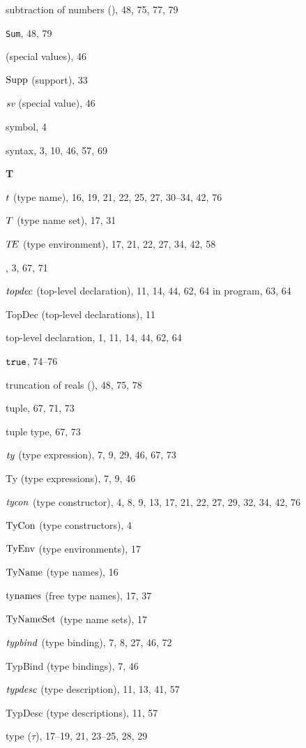 \begin{theindex}
\item subtraction of numbers (\ml{-}), 48, 75, 77, 79
\item {\tt Sum}, 48, 79
\item {\SVal} (special values), 46
\item $\mathop{\rm Supp}\nolimits$ (support), 33
\item $\mbox{\it sv}$ (special value), 46
\item symbol, 4
\item syntax, 3, 10, 46, 57, 69
\indexspace
\parbox{65mm}{\hfil{\large\bf T}\hfil}
\indexspace
\item $t$ (type name), 16, 19, 21, 22, 25, 27, 30--34, 42, 76
\item $T$ (type name set), 17, 31
\item $\mbox{$T\!E$}$ (type environment), 17, 21, 22, 27, 34, 42, 58
\item \THEN, 3, 67, 71
\item ${\it topdec}$ (top-level declaration), 11, 14, 44, 62, 64
\subitem in program, 63, 64
\item TopDec (top-level declarations), 11
\item top-level declaration, 1, 11, 14, 44, 62, 64
\item $\mbox{\tt true}$, 74--76
\item truncation of reals (), 48, 75, 78
\item tuple, 67, 71, 73
\item tuple type, 67, 73
\item ${\it ty}$ (type expression), 7, 9, 29, 46, 67, 73
\item Ty (type expressions), 7, 9, 46
\item ${\it tycon}$ (type constructor), 4, 8, 9, 13, 17, 21, 22, 27, 29, 32, 34, 42, 76
\item ${\rm TyCon}$ (type constructors), 4
\item ${\rm TyEnv}$ (type environments), 17
\item ${\rm TyName}$ (type names), 16
\item $\mathop{\rm tynames}\nolimits$ (free type names), 17, 37
\item ${\rm TyNameSet}$ (type name sets), 17
\item ${\it typbind}$ (type binding), 7, 8, 27, 46, 72
\item TypBind (type bindings), 7, 46
\item ${\it typdesc}$ (type description), 11, 13, 41, 57
\item TypDesc (type descriptions), 11, 57
\item type ($\tau$), 17--19, 21, 23--25, 28, 29

\end{theindex}

